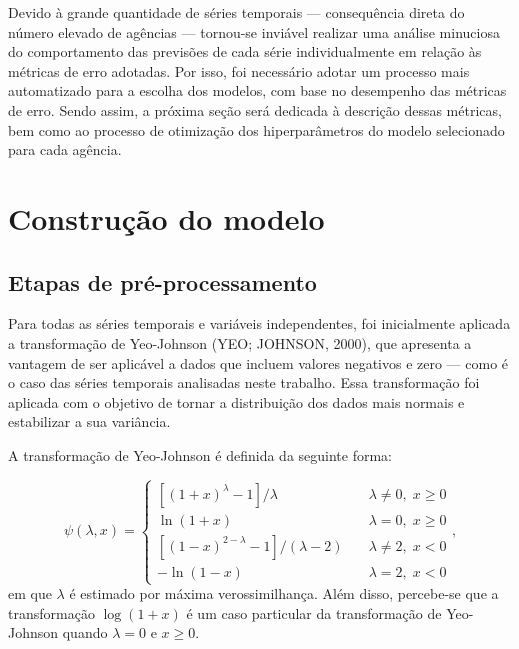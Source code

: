 \documentclass[
  12pt,
  a4paper,
]{scrreprt}
\begin{document}
\vspace{12pt}

Devido à grande quantidade de séries temporais --- consequência direta
do número elevado de agências --- tornou-se inviável realizar uma
análise minuciosa do comportamento das previsões de cada série
individualmente em relação às métricas de erro adotadas. Por isso, foi
necessário adotar um processo mais automatizado para a escolha dos
modelos, com base no desempenho das métricas de erro. Sendo assim, a
próxima seção será dedicada à descrição dessas métricas, bem como ao
processo de otimização dos hiperparâmetros do modelo selecionado para
cada agência.

\section{Construção do modelo}\label{construuxe7uxe3o-do-modelo}

\subsection{Etapas de
pré-processamento}\label{etapas-de-pruxe9-processamento}

Para todas as séries temporais e variáveis independentes, foi
inicialmente aplicada a transformação de Yeo-Johnson (YEO; JOHNSON,
2000), que apresenta a vantagem de ser aplicável a dados que incluem
valores negativos e zero --- como é o caso das séries temporais
analisadas neste trabalho. Essa transformação foi aplicada com o
objetivo de tornar a distribuição dos dados mais normais e estabilizar a
sua variância.

\vspace{12pt}

A transformação de Yeo-Johnson é definida da seguinte forma:

\[
\psi(\lambda, x) = \begin{cases}
    [(1 + x)^\lambda - 1] / \lambda  &  \lambda \neq 0, \; x \ge 0 \\
    \ln(1 + x)                       &  \lambda = 0, \; x \ge 0 \\
    [(1 - x)^{2 - \lambda} - 1] / (\lambda - 2) \quad & \lambda \neq 2, \; x < 0 \\
    -\ln(1 - x)                     &   \lambda = 2, \; x < 0
\end{cases} \text{,}
\] em que \(\lambda\) é estimado por máxima verossimilhança. Além disso,
percebe-se que a transformação \(\log(1 + x)\) é um caso particular da
transformação de Yeo-Johnson quando \(\lambda = 0\) e \(x \ge 0\).
\end{document}
